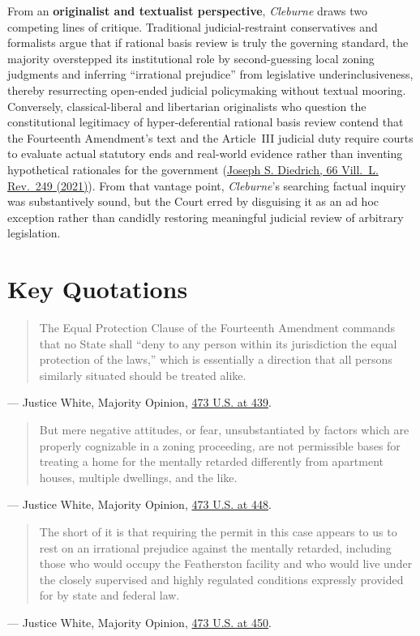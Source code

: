 \documentclass[12pt]{article}
\begin{document}
From an \textbf{originalist and textualist perspective}, \textit{Cleburne} draws two competing lines of critique. Traditional judicial-restraint conservatives and formalists argue that if rational basis review is truly the governing standard, the majority overstepped its institutional role by second-guessing local zoning judgments and inferring ``irrational prejudice'' from legislative underinclusiveness, thereby resurrecting open-ended judicial policymaking without textual mooring. Conversely, classical-liberal and libertarian originalists who question the constitutional legitimacy of hyper-deferential rational basis review contend that the Fourteenth Amendment's text and the Article~III judicial duty require courts to evaluate actual statutory ends and real-world evidence rather than inventing hypothetical rationales for the government (\href{https://digitalcommons.law.villanova.edu/cgi/viewcontent.cgi?article=3486&context=vlr}{Joseph S. Diedrich, 66 Vill.\ L. Rev.\ 249 (2021)}). From that vantage point, \textit{Cleburne}'s searching factual inquiry was substantively sound, but the Court erred by disguising it as an ad hoc exception rather than candidly restoring meaningful judicial review of arbitrary legislation.

\section{Key Quotations}

\begin{quote}
The Equal Protection Clause of the Fourteenth Amendment commands that no State shall ``deny to any person within its jurisdiction the equal protection of the laws,'' which is essentially a direction that all persons similarly situated should be treated alike.
\end{quote}
\noindent --- Justice White, Majority Opinion, \href{https://supreme.justia.com/cases/federal/us/473/432/}{473 U.S. at 439}.

\begin{quote}
But mere negative attitudes, or fear, unsubstantiated by factors which are properly cognizable in a zoning proceeding, are not permissible bases for treating a home for the mentally retarded differently from apartment houses, multiple dwellings, and the like.
\end{quote}
\noindent --- Justice White, Majority Opinion, \href{https://supreme.justia.com/cases/federal/us/473/432/}{473 U.S. at 448}.

\begin{quote}
The short of it is that requiring the permit in this case appears to us to rest on an irrational prejudice against the mentally retarded, including those who would occupy the Featherston facility and who would live under the closely supervised and highly regulated conditions expressly provided for by state and federal law.
\end{quote}
\noindent --- Justice White, Majority Opinion, \href{https://supreme.justia.com/cases/federal/us/473/432/}{473 U.S. at 450}.
\end{document}
